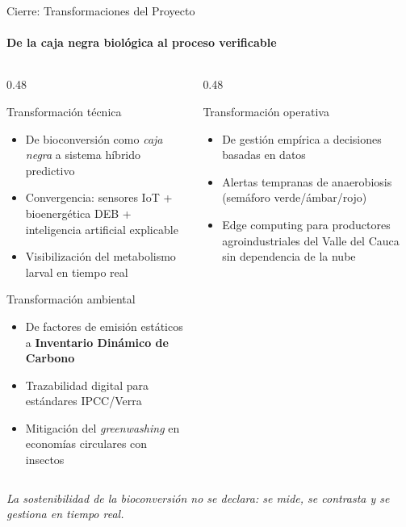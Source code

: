 \documentclass[aspectratio=169, 11pt]{beamer}
\begin{document}
\begin{frame}{Cierre: Transformaciones del Proyecto}
\framesubtitle{De la caja negra biológica al proceso verificable}

\begin{columns}[T,onlytextwidth]

\begin{column}{0.48\textwidth}

\begin{block}{Transformación técnica}
\scriptsize
\begin{itemize}
    \item De bioconversión como \textit{caja negra} a sistema híbrido predictivo
    \item Convergencia: sensores IoT + bioenergética DEB + inteligencia artificial explicable
    \item Visibilización del metabolismo larval en tiempo real
\end{itemize}
\end{block}

\vspace{0.12cm}
\begin{block}{Transformación ambiental}
\scriptsize
\begin{itemize}
    \item De factores de emisión estáticos a \textbf{Inventario Dinámico de Carbono}
    \item Trazabilidad digital para estándares IPCC/Verra
    \item Mitigación del \textit{greenwashing} en economías circulares con insectos
\end{itemize}
\end{block}

\end{column}

\begin{column}{0.48\textwidth}

\begin{block}{Transformación operativa}
\scriptsize
\begin{itemize}
    \item De gestión empírica a decisiones basadas en datos
    \item Alertas tempranas de anaerobiosis (semáforo verde/ámbar/rojo)
    \item Edge computing para productores agroindustriales del Valle del Cauca sin dependencia de la nube
\end{itemize}
\end{block}

\end{column}

\end{columns}

\vspace{0.30cm}

\begin{alertblock}{}
\centering
\footnotesize
\textit{La sostenibilidad de la bioconversión no se declara: se mide, se contrasta y se gestiona en tiempo real.}
\end{alertblock}

\end{frame}
\end{document}
